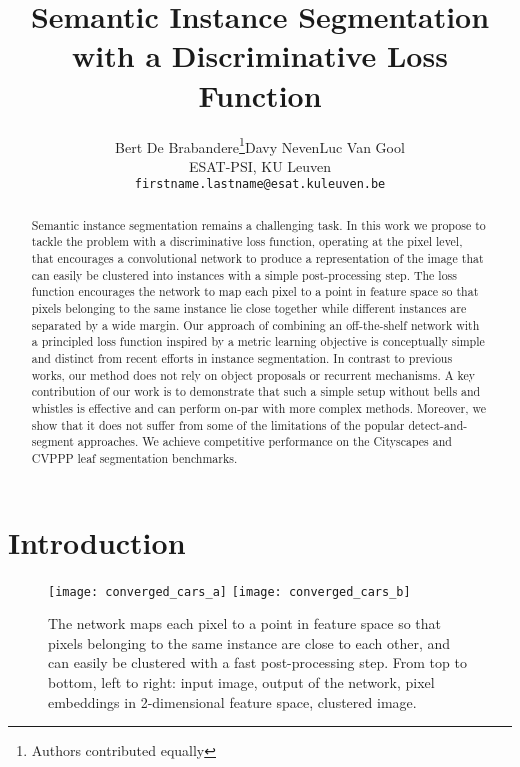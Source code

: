 \documentclass[10pt,twocolumn,letterpaper]{article}
\begin{document}
\title{Semantic Instance Segmentation with a Discriminative Loss Function}

\author{Bert De Brabandere\thanks{Authors contributed equally}\qquad Davy Neven\qquad Luc Van Gool\\
ESAT-PSI, KU Leuven\\
{\tt\small firstname.lastname@esat.kuleuven.be}
}

\maketitle


\begin{abstract}
Semantic instance segmentation remains a challenging task. In this work we propose to tackle the problem with a discriminative loss function, operating at the pixel level, that encourages a convolutional network to produce a representation of the image that can easily be clustered into instances with a simple post-processing step.
The loss function encourages the network to map each pixel to a point in feature space so that pixels belonging to the same instance lie close together while different instances are separated by a wide margin.
Our approach of combining an off-the-shelf network with a principled loss function inspired by a metric learning objective is conceptually simple and distinct from recent efforts in instance segmentation. 
In contrast to previous works, our method does not rely on object proposals or recurrent mechanisms.
A key contribution of our work is to demonstrate that such a simple setup without bells and whistles is effective and can perform on-par with more complex methods. Moreover, we show that it does not suffer from some of the limitations of the popular detect-and-segment approaches.
We achieve competitive performance on the Cityscapes and CVPPP leaf segmentation benchmarks.
\end{abstract}

\section{Introduction}
\label{sec:introduction}
\begin{figure}[t]
	\begin{center}
\texttt{[image: converged\_cars\_a]}
		\texttt{[image: converged\_cars\_b]}
	\end{center}
	\caption{The network maps each pixel to a point in feature space so that pixels belonging to the same instance are close to each other, and can easily be clustered with a fast post-processing step. From top to bottom, left to right: input image, output of the network, pixel embeddings in 2-dimensional feature space, clustered image.}
	\label{fig:converged_leafs}
\end{figure}
\end{document}
